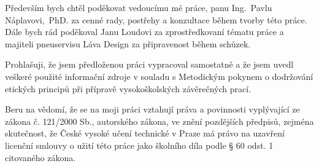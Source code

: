 \documentclass[czech,bachelor,unicode]{template/ctufit-thesis}
\theoremstyle{plain}
\theoremstyle{definition}
\theoremstyle{remark}
\numberwithin{theorem}{chapter}
\begin{document}
 
\frontmatter\frontmatterinit %
\thispagestyle{empty}\cleardoublepage\maketitle %
\imprintpage %
\tableofcontents %
\listoffigures %
\begingroup
\let\clearpage\relax
\listoftables %
\endgroup
\begin{acknowledgmentpage}
	Především bych chtěl poděkovat vedoucímu mé práce, panu Ing.~Pavlu Náplavovi,~PhD. za cenné rady, postřehy a konzultace během tvorby této práce. 
	Dále bych rád poděkoval Janu Loudovi za zprostředkovaní tématu práce a majiteli pneuservisu Láva Design za připravenost během schůzek.
\end{acknowledgmentpage} 
\begin{declarationpage}
Prohlašuji, že jsem předloženou práci vypracoval samostatně a že jsem uvedl veškeré
použité informační zdroje v souladu s Metodickým pokynem o dodržování etických
principů při přípravě vysokoškolských závěrečných prací.

Beru na vědomí, že se na moji práci vztahují práva a povinnosti vyplývající ze zákona
č. 121/2000 Sb., autorského zákona, ve znění pozdějších předpisů, zejména
skutečnost, že České vysoké učení technické v Praze má právo na uzavření licenční
smlouvy o užití této práce jako školního díla podle § 60 odst. 1 citovaného zákona.
\end{declarationpage}
\end{document}
